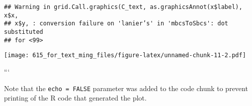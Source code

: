 \documentclass[]{article}
\newenvironment{Shaded}{\begin{snugshade}}{\end{snugshade}}
\newcommand{\KeywordTok}[1]{\textcolor[rgb]{0.13,0.29,0.53}{\textbf{{#1}}}}
\newcommand{\DataTypeTok}[1]{\textcolor[rgb]{0.13,0.29,0.53}{{#1}}}
\newcommand{\DecValTok}[1]{\textcolor[rgb]{0.00,0.00,0.81}{{#1}}}
\newcommand{\StringTok}[1]{\textcolor[rgb]{0.31,0.60,0.02}{{#1}}}
\newcommand{\CommentTok}[1]{\textcolor[rgb]{0.56,0.35,0.01}{\textit{{#1}}}}
\newcommand{\OtherTok}[1]{\textcolor[rgb]{0.56,0.35,0.01}{{#1}}}
\newcommand{\NormalTok}[1]{{#1}}
\begin{document}
\begin{verbatim}
## Warning in grid.Call.graphics(C_text, as.graphicsAnnot(x$label), x$x,
## x$y, : conversion failure on 'lanier’s' in 'mbcsToSbcs': dot substituted
## for <99>
\end{verbatim}

\texttt{[image: 615\_for\_text\_ming\_files/figure-latex/unnamed-chunk-11-2.pdf]}

\begin{Shaded}
\end{Shaded}

```

Note that the \texttt{echo\ =\ FALSE} parameter was added to the code
chunk to prevent printing of the R code that generated the plot.
\end{document}
